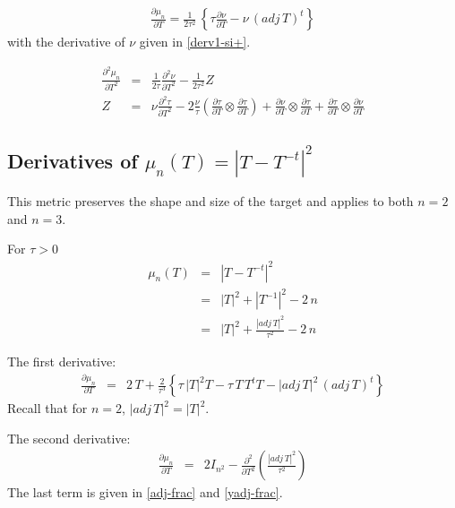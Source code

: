 \documentclass{report}
\begin{document}
\begin{eqnarray}
\frac{\partial \mu_n}{\partial T} = \frac{1}{2 \tau^2} \, \left\{ \tau \frac{\partial \nu}{\partial T} - \nu \, (adj \, T)^t \right\}
\end{eqnarray}
with the derivative of $\nu$ given in \ref{derv1-si+}. \newline

\begin{eqnarray}
\frac{\partial^2 \mu_n}{\partial T^2} & = & \frac{1}{2 \tau} \frac{\partial^2 \nu}{\partial T^2} - \frac{1}{2 \tau^2} Z \\
Z & = & \nu \frac{\partial^2 \tau}{\partial T^2} - 2 \frac{\nu}{\tau} \left( \frac{\partial \tau}{\partial T} \otimes \frac{\partial \tau}{\partial T} \right) + \frac{\partial \nu}{\partial T} \otimes \frac{\partial \tau}{\partial T} + \frac{\partial \tau}{\partial T} \otimes \frac{\partial \nu}{\partial T}
\end{eqnarray}

\subsection{Derivatives of $\mu_n(T)=|T-T^{-t}|^2$}

\noindent This metric preserves the shape and size of the target and applies
to both $n=2$ and $n=3$. \newline

\noindent For $\tau>0$
\begin{eqnarray}
\mu_n(T) & = & |T-T^{-t}|^2 \\
         & = & |T|^2 + |T^{-1}|^2 - 2 \, n \\
         & = & |T|^2 + \frac{|adj \, T|^2}{\tau^2} - 2 \, n
\end{eqnarray}

\noindent The first derivative:
\begin{eqnarray}
\frac{\partial \mu_n}{\partial T} & = & 2 \, T + \frac{2}{\tau^3} \left\{ \tau \, |T|^2 T - \tau \, T \, T^t T - |adj \, T|^2 \, (adj \, T)^t \right\}
\end{eqnarray}
Recall that for $n=2$, $|adj \, T|^2=|T|^2$. \newline

\noindent The second derivative:
\begin{eqnarray}
\frac{\partial \mu_n}{\partial T} & = & 2 I_{n^2} - \frac{\partial^2}{\partial T^2} \left( \frac{|adj \, T|^2}{\tau^2} \right)
\end{eqnarray}
The last term is given in \ref{adj-frac} and \ref{yadj-frac}. \newline
\end{document}
